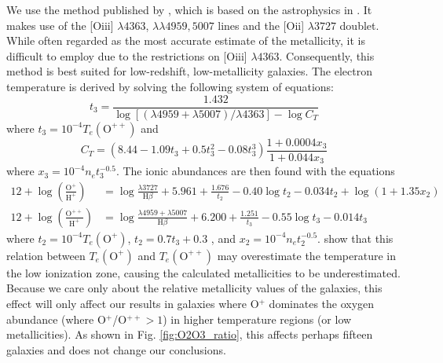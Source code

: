 We use the method published by \cite{Izotov06}, which is based on the 
astrophysics in \cite{Osterbrock89}.  It makes use of the [O{\sc iii}] 
$\lambda 4363$, $\lambda \lambda 4959, 5007$ lines and the [O{\sc ii}] 
$\lambda 3727$ doublet.  While often regarded as the most accurate estimate of 
the metallicity, it is difficult to employ due to the restrictions on 
[O{\sc iii}] $\lambda 4363$.  Consequently, this method is best suited for 
low-redshift, low-metallicity galaxies.  The electron temperature is derived by 
solving the following system of equations:
\begin{equation}
	t_3 = \frac{1.432}{\log[(\lambda 4959 + \lambda 5007)/\lambda 4363] - \log C_T}
\end{equation}
where $t_3 = 10^{-4} T_e(\text{O}^{++})$ and
\begin{equation}
	C_T = (8.44 - 1.09t_3 + 0.5t_3^2 - 0.08t_3^3)\frac{1 + 0.0004x_3}{1 + 0.044x_3}
\end{equation}
where $x_3 = 10^{-4} n_e t_3^{-0.5}$.  The ionic abundances are then found with 
the equations
\begin{align}
	12 + \log \left( \frac{\text{O}^+}{\text{H}^+} \right) &= \log \frac{\lambda 3727}{\text{H}\beta} + 5.961 + \frac{1.676}{t_2} - 0.40\log t_2 - 0.034t_2 + \log (1+1.35x_2) \\
	12 + \log \left( \frac{\text{O}^{++}}{\text{H}^+} \right) &= \log \frac{\lambda 4959 + \lambda 5007}{\text{H}\beta} + 6.200 + \frac{1.251}{t_3} - 0.55\log t_3 - 0.014t_3
\end{align}
where $t_2 = 10^{-4} T_e(\text{O}^+)$, $t_2 = 0.7t_3 + 0.3$ \citep{Garnett92}, 
and $x_2 = 10^{-4} n_e t_2^{-0.5}$.  \cite{Andrews13} show that this relation 
between $T_e(\text{O}^+)$ and $T_e(\text{O}^{++})$ may overestimate the 
temperature in the low ionization zone, causing the calculated metallicities to 
be underestimated.  Because we care only about the relative metallicity values 
of the galaxies, this effect will only affect our results in galaxies where 
O$^+$ dominates the oxygen abundance (where O$^+$/O$^{++} > 1$) in higher 
temperature regions (or low metallicities).  As shown in Fig. 
\ref{fig:O2O3_ratio}, this affects perhaps fifteen galaxies and does not change 
our conclusions.

